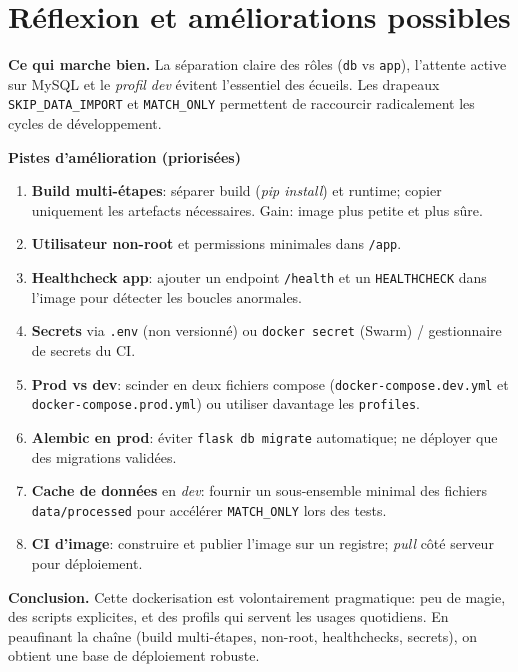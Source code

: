 \section{Réflexion et améliorations possibles}
\textbf{Ce qui marche bien.} La séparation claire des rôles (\texttt{db} vs \texttt{app}), l'attente active sur MySQL et le \textit{profil dev} évitent l'essentiel des écueils. Les drapeaux \texttt{SKIP\_DATA\_IMPORT} et \texttt{MATCH\_ONLY} permettent de raccourcir radicalement les cycles de développement.

\medskip
\noindent\textbf{Pistes d'amélioration (priorisées)}
\begin{enumerate}
  \item \textbf{Build multi-étapes}: séparer build (\textit{pip install}) et runtime; copier uniquement les artefacts nécessaires. Gain: image plus petite et plus sûre.
  \item \textbf{Utilisateur non-root} et permissions minimales dans \texttt{/app}.
  \item \textbf{Healthcheck app}: ajouter un endpoint \texttt{/health} et un \texttt{HEALTHCHECK} dans l'image pour détecter les boucles anormales.
  \item \textbf{Secrets} via \texttt{.env} (non versionné) ou \texttt{docker secret} (Swarm) / gestionnaire de secrets du CI.
  \item \textbf{Prod vs dev}: scinder en deux fichiers compose (\texttt{docker-compose.dev.yml} et \texttt{docker-compose.prod.yml}) ou utiliser davantage les \texttt{profiles}.
  \item \textbf{Alembic en prod}: éviter \texttt{flask db migrate} automatique; ne déployer que des migrations validées.
  \item \textbf{Cache de données} en \textit{dev}: fournir un sous-ensemble minimal des fichiers \texttt{data/processed} pour accélérer \texttt{MATCH\_ONLY} lors des tests.
  \item \textbf{CI d'image}: construire et publier l'image sur un registre; \textit{pull} côté serveur pour déploiement.
\end{enumerate}

\medskip
\noindent\textbf{Conclusion.} Cette dockerisation est volontairement pragmatique: peu de magie, des scripts explicites, et des profils qui servent les usages quotidiens. En peaufinant la chaîne (build multi-étapes, non-root, healthchecks, secrets), on obtient une base de déploiement robuste.
